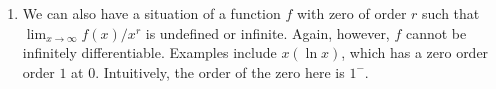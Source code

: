 \documentclass[10pt]{amsart}
\begin{document}
\begin{enumerate}
  {\em Thus, the rule for logarithm near $0$ (where the zero has
  degree $0^-$) is somewhat opposite to the rule for logarithm out to
  $\infty$ (where the growth is $0^+$)}.
\item We can also have a situation of a function $f$ with zero of
  order $r$ such that $\lim_{x \to \infty} f(x)/x^r$ is undefined or
  infinite. Again, however, $f$ cannot be infinitely
  differentiable. Examples include $x(\ln x)$, which has a zero order
  order $1$ at $0$. Intuitively, the order of the zero here is $1^-$.
\end{enumerate}
\end{document}
